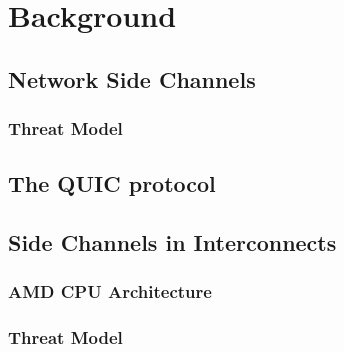 \chapter{Background}

\section{Network Side Channels}\label{sec:nsc}
\subsection{Threat Model}\label{subsec:nsc-threat-model}
\section{The QUIC protocol}\label{sec:quic}
\section{Side Channels in Interconnects}\label{sec:interconnect-sc-bg}
\subsection{AMD CPU Architecture}\label{subsec:amd-arch-bg}
\subsection{Threat Model}\label{subsec:interconnect-sc-threat-model}

\endinput
